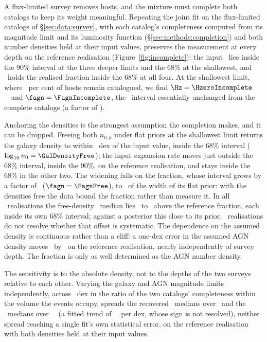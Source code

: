 A flux-limited survey removes hosts, and the mixture must complete both
catalogs to keep its weight meaningful. Repeating the joint fit on the
flux-limited catalogs of \S\ref{sec:data:survey}, with each catalog's
completeness computed from its magnitude limit and its luminosity function
(\S\ref{sec:methods:completion}) and both number densities held at their
input values, preserves the measurement at every depth on the reference
realisation (Figure~\ref{fig:incomplete}): the input \Hz\ lies inside the
90\% interval at the three deeper limits and the 68\% at the shallowest,
and \fagn\ holds the realised fraction inside the 68\% at all four. At the
shallowest limit, where \CompMEighteen\ per cent of hosts remain
catalogued, we find $\Hz = \HzeroIncomplete$~\kmsmpc\ and
$\fagn = \FagnIncomplete$, the \fagn\ interval essentially unchanged from
the complete catalogs (a factor of \FagnWidthRatio).

Anchoring the densities is the strongest assumption the completion makes,
and it can be dropped. Freeing both $n_{0,k}$ under flat priors at the
shallowest limit returns the galaxy density to within
\GalDensityFreeOffsetDex~dex of the input value, inside the 68\% interval
($\log_{10} n_0 = \GalDensityFree$); the input expansion rate moves just
outside the 68\% interval, inside the 90\%, on the reference realisation,
and stays inside the 68\% in the other two. The widening falls on
the fraction, whose interval grows by a factor of \FagnFreeWidthRatio\
($\fagn = \FagnFree$), to \FagnFreeWidthOfPrior\ of the width of its flat
prior: with the densities free the data bound the fraction rather than
measure it. In all \NSeedsIncomplete\ realisations the free-density \fagn\
median lies \FagnFreeOffsetMin\ to \FagnFreeOffsetMax\ above the reference
fraction, each inside its own 68\% interval; against a posterior this close
to its prior, \NSeedsIncomplete\ realisations do not
resolve whether that offset is systematic. The dependence on the assumed
density is continuous rather than a cliff: a one-dex error in the assumed
AGN density moves \fagn\ by \FagnDensitySlope\ on the reference realisation,
nearly independently of survey depth. The fraction
is only as well determined as the AGN number density.

The sensitivity is to the absolute density, not to the depths of the two
surveys relative to each other. Varying the galaxy and AGN magnitude limits
independently, across \RelCompletenessSpanDex~dex in the ratio of the two
catalogs' completeness within the volume the events occupy, spreads the
recovered \fagn\ medians over \FagnRelSpan\ and the \Hz\ medians over
\HzeroRelSpan~\kmsmpc\ (a fitted
trend of \HzeroRelSlope~\kmsmpc\ per dex, whose sign is not resolved),
neither spread reaching a single fit's own statistical error, on the
reference realisation with both densities held at their input values.

